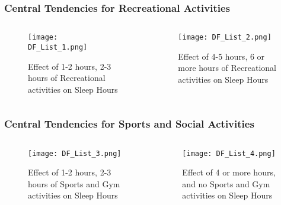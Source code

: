 \documentclass[11pt,]{beamer}
\begin{document}
\begin{frame}

    
	\frametitle{Central Tendencies for Recreational Activities}
	
	\begin{columns}[c]
	
	\begin{column}{.5\textwidth}
    	\begin{figure}
    		\texttt{[image: DF\_List\_1.png]}
    		\caption{
    		\tiny{Effect of 1-2 hours, 2-3 hours of Recreational activities on Sleep Hours}
    		}
    	\end{figure}
	\end{column}

    \begin{column}{.5\textwidth}
    	\begin{figure}
    		\texttt{[image: DF\_List\_2.png]}
    		\caption{
    		\tiny{Effect of 4-5 hours, 6 or more hours of Recreational activities on Sleep Hours}
    		}
    	\end{figure}
	\end{column}
	
    \end{columns}	
	
\end{frame}

\begin{frame}

    
	\frametitle{Central Tendencies for Sports and Social Activities}
	
	\begin{columns}[c]
	
	\begin{column}{.5\textwidth}
    	\begin{figure}
    		\texttt{[image: DF\_List\_3.png]}
    		\caption{
    		\tiny{Effect of 1-2 hours, 2-3 hours of Sports and Gym activities on Sleep Hours} 
    		}
    	\end{figure}
	\end{column}

    \begin{column}{.5\textwidth}
    	\begin{figure}
    		\texttt{[image: DF\_List\_4.png]}
    		\caption{
    	    \tiny{Effect of 4 or more hours, and no Sports and Gym activities on Sleep Hours}
    		}
    	\end{figure}
	\end{column}
	
    \end{columns}
	
\end{frame}
\end{document}
